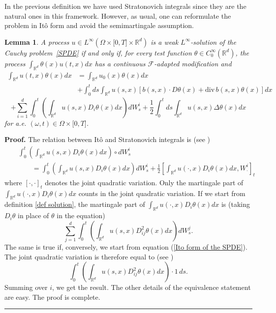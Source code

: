 \documentclass[a4paper,11pt]{article}
\newtheorem{lemma}[theorem]{Lemma}
\newenvironment{proof}[1][Proof]{\textbf{#1.} }{\ \rule{0.5em}{0.5em}}
\begin{document}
In the previous definition we have used Stratonovich integrals since they
are the natural ones in this framework. However, as usual, one can
reformulate the problem in It\^{o} form and avoid the
semimartingale assumption.

\begin{lemma}
\label{lemma su Ito-Stratonovich}A process $u\in L^{\infty }(\Omega \times
\lbrack 0,T]\times \mathbb{R}^{d})$ is a weak $L^{\infty }$-solution of the
Cauchy problem~\eqref{SPDE} if and only if, for every test function $\theta
\in C_{0}^{\infty }(\mathbb{R}^{d})$, the process $\int_{\mathbb{R}%
^{d}}\theta (x)u(t,x)dx$ has a continuous $\mathcal{F}$-adapted
modification and\
\begin{align*}
\int_{\mathbb{R}^{d}}u(t,x)\theta (x)dx& =\int_{\mathbb{R}%
^{d}}u_{0}(x)\theta (x)dx \\
& +\int_{0}^{t}ds\int_{\mathbb{R}^{d}}u(s,x)\left[ b(s,x)\cdot D\theta (x)+%
\mathrm{div}\,b(s,x)\theta (x)\right] dx
\end{align*}
\begin{equation}
+\sum_{i=1}^{d}\int_{0}^{t}\left( \int_{\mathbb{R}^{d}}u(s,x)D_{i}\theta
(x)dx\right) dW_{s}^{i}+\frac{1}{2}\int_{0}^{t}ds\int_{\mathbb{R}%
^{d}}u(s,x)\Delta \theta (x)dx  \label{Ito form of the SPDE}
\end{equation}
for a.e. $(\omega ,t)\in \Omega \times \lbrack 0,T]$.
\end{lemma}

\begin{proof}
The relation between It\^{o} and Stratonovich integrals is (see \cite{K})
\begin{eqnarray*}
&&\int_{0}^{t} \left( \int_{\mathbb{R}^{d}}u(s,x)D_{i}\theta(x) dx\right) \circ
dW_{s}^{i} \\ && \qquad = \int_{0}^{t}\left( \int_{\mathbb{R}^{d}}u(s,x)D_{i}\theta
(x)dx\right) dW_{s}^{i}
+\frac{1}{2}\left[ \int_{\mathbb{R}^{d}}u(\cdot ,x)D_{i}\theta(x) dx,W_{\cdot
}^{i}\right] _{t}
\end{eqnarray*}
where $\left[ \cdot ,\cdot \right] _{t}$ denotes the joint quadratic
variation. Only the martingale part of $\int_{\mathbb{R}^{d}}u(\cdot
,x)D_{i}\theta(x) dx$ counts in the joint quadratic variation. If we start from
definition \ref{def solution}, the martingale part of $\int_{\mathbb{R}%
^{d}}u(\cdot ,x)D_{i}\theta(x) dx$ is (taking $D_{i}\theta $ in place of $%
\theta $ in the equation)
\begin{equation*}
\sum_{j=1}^{d}\int_{0}^{t}\left( \int_{\mathbb{R}^{d}}u(s,x)D^2_{ij}\theta(x)
dx\right) dW_{s}^{j}.
\end{equation*}
The same is true if, conversely, we start from equation (\ref{Ito form of
the SPDE}). The joint quadratic variation is therefore equal to (see \cite{K}%
)
\begin{equation*}
\int_{0}^{t}\left( \int_{\mathbb{R}^{d}}u(s,x)D^2_{ij}\theta(x) dx\right)
\cdot 1\, ds.
\end{equation*}
Summing over $i$, we get the result. The other details of the equivalence
statement are easy. The proof is complete.
\end{proof}
\end{document}
